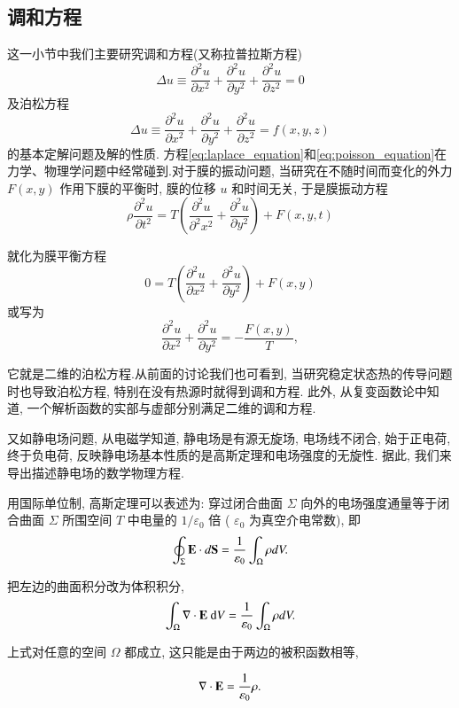 \subsection{调和方程}
这一小节中我们主要研究调和方程(又称拉普拉斯方程)
\begin{equation}
    \Delta u \equiv \frac{\partial^2 u}{\partial x^2}+\frac{\partial^2 u}{\partial y^2}+\frac{\partial^2 u}{\partial z^2}=0
    \label{eq:laplace_equation}
\end{equation}
及泊松方程
\begin{equation}
    \Delta u \equiv \frac{\partial^2 u}{\partial x^2}+\frac{\partial^2 u}{\partial y^2}+\frac{\partial^2 u}{\partial z^2}=f(x, y, z)
    \label{eq:poisson_equation}
\end{equation}
的基本定解问题及解的性质.
方程\ref{eq:laplace_equation}和\ref{eq:poisson_equation}在力学、物理学问题中经常碰到.对于膜的振动问题, 
当研究在不随时间而变化的外力 $F(x, y)$ 
作用下膜的平衡时, 膜的位移 $u$ 和时间无关, 于是膜振动方程
$$
\rho \frac{\partial^2 u}{\partial t^2}=T\left(\frac{\partial^2 u}{\partial^2 x^2}
+\frac{\partial^2 u}{\partial y^2}\right)+F(x, y, t)
$$

就化为膜平衡方程
$$
0=T\left(\frac{\partial^2 u}{\partial x^2}+\frac{\partial^2 u}{\partial y^2}\right)+F(x, y)
$$
或写为
$$
\frac{\partial^2 u}{\partial x^2}+\frac{\partial^2 u}{\partial y^2}=-\frac{F(x, y)}{T},
$$

它就是二维的泊松方程.从前面的讨论我们也可看到, 
当研究稳定状态热的传导问题时也导致泊松方程, 特别在没有热源时就得到调和方程. 
此外, 从复变函数论中知道, 一个解析函数的实部与虚部分别满足二维的调和方程.

又如静电场问题, 从电磁学知道, 静电场是有源无旋场, 电场线不闭合, 始于正电荷, 
终于负电荷, 反映静电场基本性质的是高斯定理和电场强度的无旋性. 据此, 我们来导出描述静电场的数学物理方程.

用国际单位制, 高斯定理可以表述为: 穿过闭合曲面 $\Sigma$ 向外的电场强度通量等于闭合曲面 $\Sigma$ 
所围空间 $T$ 中电量的 $1 / \varepsilon_0$ 倍 ( $\varepsilon_0$ 为真空介电常数), 即
$$
\oint_{\Sigma} {\mathbf{E}} \cdot d {\mathbf{S}}=\frac{1}{\varepsilon_0} \int_{\Omega} \rho d V .
$$

把左边的曲面积分改为体积积分,
$$
\int_{\Omega} \nabla \cdot {\mathbf{E}} \mathrm{~d} V=\frac{1}{\varepsilon_0} \int_{\Omega} \rho d V .
$$

上式对任意的空间 $\Omega$ 都成立, 这只能是由于两边的被积函数相等,

\begin{equation}
    \nabla \cdot {\mathbf{E}}=\frac{1}{\varepsilon_0} \rho .
    \label{eq:nabla_dot_E}
\end{equation}

